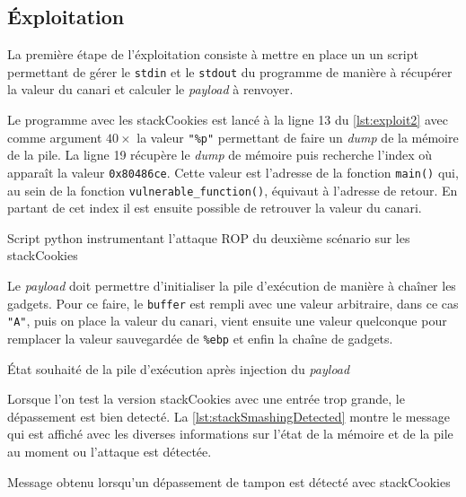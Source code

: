 \subsection{Éxploitation}

La première étape de l'éxploitation consiste à mettre en place un un script permettant
de gérer le \texttt{stdin} et le \texttt{stdout} du programme de manière à récupérer
la valeur du canari et calculer le \textit{payload} à renvoyer.

Le programme avec les \og \gls{stackCookies} \fg est lancé à la ligne 13 du
\autoref{lst:exploit2} avec comme argument $40 \times$ la valeur \texttt{"\%p"}
permettant de faire un \textit{dump} de la mémoire de la pile. La ligne 19 récupère le
\textit{dump} de mémoire puis recherche l'index où apparaît la valeur
\texttt{0x80486ce}. Cette valeur est l'adresse de la fonction \texttt{main()} qui, au
sein de la fonction \texttt{vulnerable\_function()}, équivaut à l'adresse de retour.
En partant de cet index il est ensuite possible de retrouver la valeur du canari.

\begin{listing}
	\caption{Script python instrumentant l'attaque ROP du deuxième scénario sur les \og \gls{stackCookies} \fg}
	\label{lst:exploit2}
\end{listing}

Le \textit{payload} doit permettre d'initialiser la pile d'exécution de manière à
chaîner les gadgets. Pour ce faire, le \texttt{buffer} est rempli avec une valeur
arbitraire, dans ce cas \texttt{"A"}, puis on place la valeur du canari, vient ensuite
une valeur quelconque pour remplacer la valeur sauvegardée de \texttt{\%ebp} et enfin
la chaîne de gadgets.

\begin{listing}
	\caption{État souhaité de la pile d'exécution après injection du \textit{payload}}
	\label{lst:stackAfterPayload}
\end{listing}

Lorsque l'on test la version \og \gls{stackCookies} \fg avec une entrée trop grande,
le dépassement est bien detecté. La \autoref{lst:stackSmashingDetected} montre le
message qui est affiché avec les diverses informations sur
l'état de la mémoire et de la pile au moment ou l'attaque est détectée.

\begin{listing}
	\caption{Message obtenu lorsqu'un dépassement de tampon est détecté avec \og \gls{stackCookies} \fg}
	\label{lst:stackSmashingDetected}
\end{listing}

